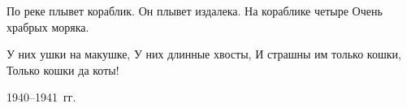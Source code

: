 По реке плывет кораблик. 
Он плывет издалека. 
На кораблике четыре 
Очень храбрых моряка.

У них ушки на макушке, 
У них длинные хвосты, 
И страшны им только кошки, 
Только кошки да коты!

1940--1941~гг.